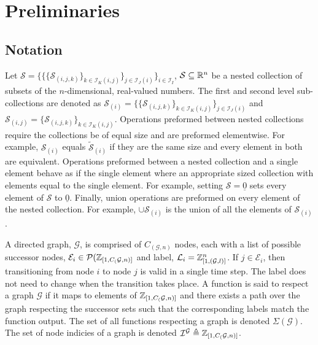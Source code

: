 \section{Preliminaries}
\subsection{Notation}
Let $\mathcal{S}=\{\{\{\mathcal{S}_{(i,j,k)}\}_{k\in\mathcal{I}_{K}(i,j)}\}_{j\in\mathcal{I}_{J}(i)}\}_{i\in\mathcal{I}_I}$, $\mathcal{S}\subseteq\mathbb{R}^n$ be a nested collection of subsets of the $n$-dimensional, real-valued numbers. The first and second level sub-collections are denoted as $\mathcal{S}_{(i)}=\{\{\mathcal{S}_{(i,j,k)}\}_{k\in\mathcal{I}_{K}(i,j)}\}_{j\in\mathcal{I}_{J}(i)}$ and $\mathcal{S}_{(i,j)}=\{\mathcal{S}_{(i,j,k)}\}_{k\in\mathcal{I}_{K}(i,j)}$. Operations preformed between nested collections require the collections be of equal size and are preformed elementwise. For example, $\mathcal{S}_{(i)}$ equals $\tilde{\mathcal{S}}_{(i)}$ if they are the same size and every element in both are equivalent. Operations preformed between a nested collection and a single element behave as if the single element where an appropriate sized collection with elements equal to the single element. For example, setting $\mathcal{S}=\underline{0}$ sets every element of $\mathcal{S}$ to $\underline{0}$. Finally, union operations are preformed on every element of the nested collection. For example, $\cup \mathcal{S}_{(i)}$ is the union of all the elements of $\mathcal{S}_{(i)}$.

A directed graph, $\mathcal{G}$, is comprised of $C_(\mathcal{G},n)$ nodes, each with a list of possible successor nodes,  $\mathcal{E}_i\in\mathcal{P}(\mathbb{Z}_{[1,C_(\mathcal{G},n)]}$ and label, $\mathcal{L}_i=\mathbb{Z}_{[1,(\mathcal{G},l)]}^n$. If $j\in\mathcal{E}_i$, then transitioning from node $i$ to node $j$ is valid in a single time step. The label does not need to change when the transition takes place. A function is said to respect a graph $\mathcal{G}$ if it maps to elements of $\mathbb{Z}_{[1,C_(\mathcal{G},n)]}$ and there exists a path over the graph respecting the successor sets such that the corresponding labels match the function output. The set of all functions respecting a graph is denoted $\Sigma(\mathcal{G})$. The set of node indicies of a graph is denoted $\mathcal{I}^\mathcal{G}\triangleq\mathbb{Z}_{[1,C_(\mathcal{G},n)]}$.


